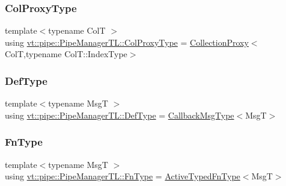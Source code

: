 \mbox{\label{structvt_1_1pipe_1_1_pipe_manager_t_l_af56c58cad882496e35f01227d4da3898}} 
\subsubsection{\texorpdfstring{Col\+Proxy\+Type}{ColProxyType}}
{\footnotesize\ttfamily template$<$typename ColT $>$ \\
using \hyperlink{structvt_1_1pipe_1_1_pipe_manager_t_l_af56c58cad882496e35f01227d4da3898}{vt\+::pipe\+::\+Pipe\+Manager\+T\+L\+::\+Col\+Proxy\+Type} =  \hyperlink{namespacevt_a0d58a693bfb96e0ce5d145692a1a1f98}{Collection\+Proxy}$<$ColT,typename Col\+T\+::\+Index\+Type$>$}

\mbox{\label{structvt_1_1pipe_1_1_pipe_manager_t_l_a5f78dde989930cf645a8bd67301740a7}} 
\subsubsection{\texorpdfstring{Def\+Type}{DefType}}
{\footnotesize\ttfamily template$<$typename MsgT $>$ \\
using \hyperlink{structvt_1_1pipe_1_1_pipe_manager_t_l_a5f78dde989930cf645a8bd67301740a7}{vt\+::pipe\+::\+Pipe\+Manager\+T\+L\+::\+Def\+Type} =  \hyperlink{structvt_1_1pipe_1_1_pipe_manager_t_l_af6fc2c17f1729fa06450441b0ee81cb1}{Callback\+Msg\+Type}$<$MsgT$>$}

\mbox{\label{structvt_1_1pipe_1_1_pipe_manager_t_l_ac2c474a68a93bbc8e1d86eb99dabf1dc}} 
\subsubsection{\texorpdfstring{Fn\+Type}{FnType}}
{\footnotesize\ttfamily template$<$typename MsgT $>$ \\
using \hyperlink{structvt_1_1pipe_1_1_pipe_manager_t_l_ac2c474a68a93bbc8e1d86eb99dabf1dc}{vt\+::pipe\+::\+Pipe\+Manager\+T\+L\+::\+Fn\+Type} =  \hyperlink{namespacevt_a54eefd5373739c7365058b0d22fea6e2}{Active\+Typed\+Fn\+Type}$<$MsgT$>$}

